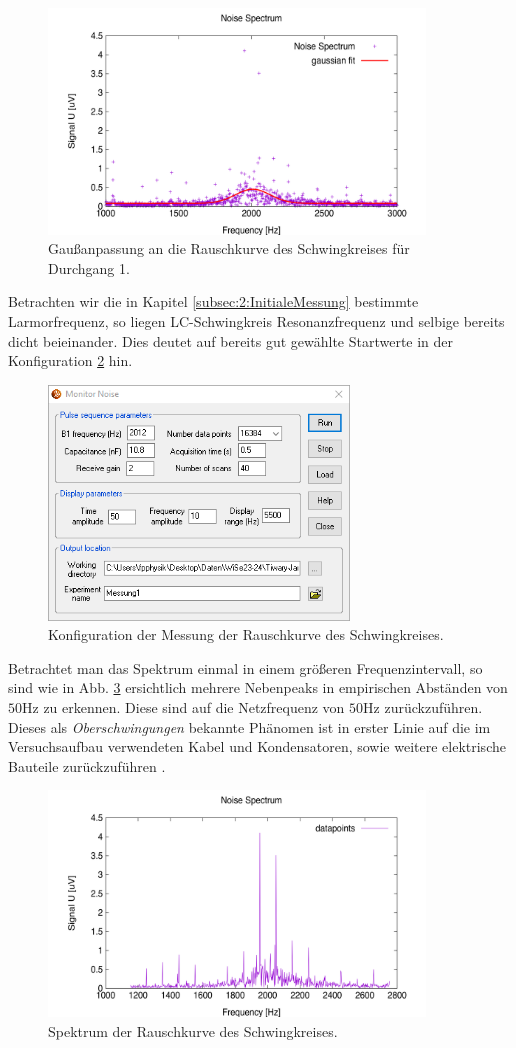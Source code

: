 \documentclass[../../main.tex]{subfiles}
\begin{document}
    \begin{figure}[H]
        \centering
        \includegraphics[width=10cm]{Bilddateien/3/Messung1_Noise_Spectrum_Gaussian.png}
        \caption{Gaußanpassung an die Rauschkurve des Schwingkreises für Durchgang 1.}
        \label{fig:3:GaussFit1}
    \end{figure}
    Betrachten wir die in Kapitel \ref{subsec:2:InitialeMessung} bestimmte Larmorfrequenz, so liegen LC-Schwingkreis Resonanzfrequenz und selbige bereits dicht beieinander. Dies deutet auf bereits gut gewählte Startwerte in der Konfiguration \ref{fig:3:MonitorNoiseConfig} hin. 
    \begin{figure}[H]
        \centering
        \includegraphics[width=8cm]{Bilddateien/3/Sec3_Monitor_Noise_Configuration.png}
        \caption{Konfiguration der Messung der Rauschkurve des Schwingkreises.}
        \label{fig:3:MonitorNoiseConfig}
    \end{figure}
    Betrachtet man das Spektrum einmal in einem größeren Frequenzintervall, so sind wie in Abb. \ref{fig:3:NoiseSpectrum} ersichtlich mehrere Nebenpeaks in empirischen Abständen von $50\si{\hertz}$ zu erkennen. Diese sind auf die Netzfrequenz von $50\si{\hertz}$ zurückzuführen. Dieses als \emph{Oberschwingungen} bekannte Phänomen ist in erster Linie auf die im Versuchsaufbau verwendeten Kabel und Kondensatoren, sowie weitere elektrische Bauteile zurückzuführen \cite[TÜV]{TUEV:Oberschwingungen}.
    \begin{figure}[H]
        \centering
        \includegraphics[width=10cm]{Bilddateien/3/Messung1_Noise_Spectrum.png}
        \caption{Spektrum der Rauschkurve des Schwingkreises.}
        \label{fig:3:NoiseSpectrum}
    \end{figure}

\end{document}

